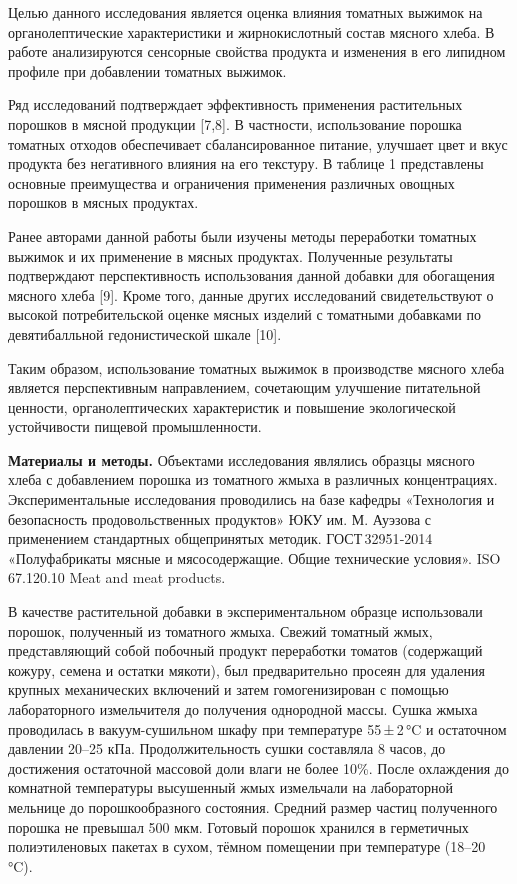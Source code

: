 \begin{multicols}{2}
Целью данного исследования является оценка влияния томатных выжимок на
органолептические характеристики и жирнокислотный состав мясного хлеба.
В работе анализируются сенсорные свойства продукта и изменения в его
липидном профиле при добавлении томатных выжимок.

Ряд исследований подтверждает эффективность применения растительных
порошков в мясной продукции {[}7,8{]}. В частности, использование
порошка томатных отходов обеспечивает сбалансированное питание, улучшает
цвет и вкус продукта без негативного влияния на его текстуру. В таблице
1 представлены основные преимущества и ограничения применения различных
овощных порошков в мясных продуктах.

Ранее авторами данной работы были изучены методы переработки томатных
выжимок и их применение в мясных продуктах. Полученные результаты
подтверждают перспективность использования данной добавки для обогащения
мясного хлеба {[}9{]}. Кроме того, данные других исследований
свидетельствуют о высокой потребительской оценке мясных изделий с
томатными добавками по девятибалльной гедонистической шкале {[}10{]}.

Таким образом, использование томатных выжимок в производстве мясного
хлеба является перспективным направлением, сочетающим улучшение
питательной ценности, органолептических характеристик и повышение
экологической устойчивости пищевой промышленности.

{\bfseries Материалы и методы.} Объектами исследования являлись образцы
мясного хлеба с добавлением порошка из томатного жмыха в различных
концентрациях. Экспериментальные исследования проводились на базе
кафедры «Технология и безопасность продовольственных продуктов» ЮКУ им.
М. Ауэзова с применением стандартных общепринятых методик.
ГОСТ\,32951‑2014 «Полуфабрикаты мясные и мясосодержащие. Общие
технические условия». ISO 67.120.10 Meat and meat products.

В качестве растительной добавки в экспериментальном образце использовали
порошок, полученный из томатного жмыха. Свежий томатный жмых,
представляющий собой побочный продукт переработки томатов (содержащий
кожуру, семена и остатки мякоти), был предварительно просеян для
удаления крупных механических включений и затем гомогенизирован с
помощью лабораторного измельчителя до получения однородной массы. Сушка
жмыха проводилась в вакуум-сушильном шкафу при температуре 55\,±\,2\,°C
и остаточном давлении 20--25 кПа. Продолжительность сушки составляла 8
часов, до достижения остаточной массовой доли влаги не более 10\%. После
охлаждения до комнатной температуры высушенный жмых измельчали на
лабораторной мельнице до порошкообразного состояния. Средний размер
частиц полученного порошка не превышал 500 мкм. Готовый порошок хранился
в герметичных полиэтиленовых пакетах в сухом, тёмном помещении при
температуре (18--20\,°C).


\end{multicols}
